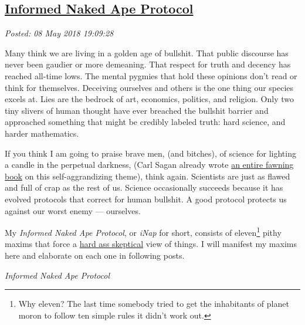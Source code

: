%

\subsection*{\href{http://analyzethedatanotthedrivel.org/2018/05/08/informed-naked-ape-protocol/}{Informed Naked Ape Protocol}}


\noindent\emph{Posted: 08 May 2018 19:09:28}
\vspace{6pt}

Many think we are living in a golden age of bullshit. That public
discourse has never been gaudier or more demeaning. That respect for
truth and decency has reached all-time lows. The mental pygmies that
hold these opinions don't read or think for themselves. Deceiving
ourselves and others is the one thing our species excels at. Lies are
the bedrock of art, economics, politics, and religion. Only two tiny
slivers of human thought have ever breached the bullshit barrier and
approached something that might be credibly labeled truth: hard science,
and harder mathematics.

If you think I am going to praise brave men, (and bitches), of science
for lighting a candle in the perpetual darkness, (Carl Sagan already
wrote
\href{https://www.goodreads.com/book/show/17349.The_Demon_Haunted_World}{an
entire fawning book} on this self-aggrandizing theme), think again.
Scientists are just as flawed and full of crap as the rest of us.
Science occasionally succeeds because it has evolved protocols that
correct for human bullshit. A good protocol protects us against our
worst enemy --- ourselves.

My \emph{Informed Naked Ape Protocol}, or \emph{iNap} for short,
consists of eleven\footnote{Why eleven? The last time somebody tried to get the inhabitants of
  planet moron to follow ten simple rules it didn't work
  out.
} pithy
maxims that force a
\href{https://analyzethedatanotthedrivel.org/2009/10/29/hard-ass-skeptic-rules/}{hard
ass skeptical} view of things. I will manifest my maxims here and
elaborate on each one in following posts.

\bigskip

\emph{Informed Naked Ape Protocol}

